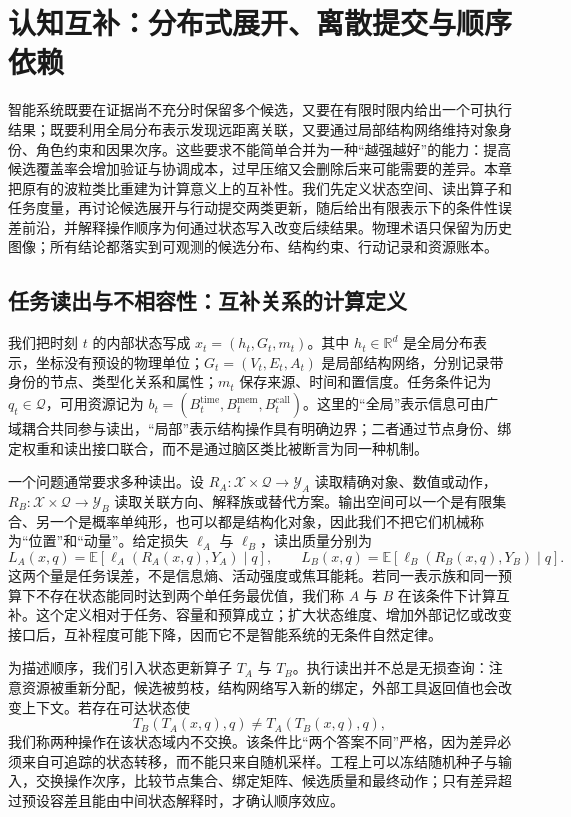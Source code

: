 \chapter{认知互补：分布式展开、离散提交与顺序依赖}
\label{chp:cognitive_complementarity}

智能系统既要在证据尚不充分时保留多个候选，又要在有限时限内给出一个可执行结果；既要利用全局分布表示发现远距离关联，又要通过局部结构网络维持对象身份、角色约束和因果次序。这些要求不能简单合并为一种“越强越好”的能力：提高候选覆盖率会增加验证与协调成本，过早压缩又会删除后来可能需要的差异。本章把原有的波粒类比重建为计算意义上的互补性。我们先定义状态空间、读出算子和任务度量，再讨论候选展开与行动提交两类更新，随后给出有限表示下的条件性误差前沿，并解释操作顺序为何通过状态写入改变后续结果。物理术语只保留为历史图像；所有结论都落实到可观测的候选分布、结构约束、行动记录和资源账本。

\section{任务读出与不相容性：互补关系的计算定义}
\label{sec:section_234544}

我们把时刻 $t$ 的内部状态写成 $x_t=(h_t,G_t,m_t)$。其中 $h_t\in\mathbb{R}^{d}$ 是全局分布表示，坐标没有预设的物理单位；$G_t=(V_t,E_t,A_t)$ 是局部结构网络，分别记录带身份的节点、类型化关系和属性；$m_t$ 保存来源、时间和置信度。任务条件记为 $q_t\in\mathcal Q$，可用资源记为 $b_t=(B_t^{\mathrm{time}},B_t^{\mathrm{mem}},B_t^{\mathrm{call}})$。这里的“全局”表示信息可由广域耦合共同参与读出，“局部”表示结构操作具有明确边界；二者通过节点身份、绑定权重和读出接口联合，而不是通过脑区类比被断言为同一种机制。

一个问题通常要求多种读出。设 $R_A:\mathcal X\times\mathcal Q\rightarrow\mathcal Y_A$ 读取精确对象、数值或动作，$R_B:\mathcal X\times\mathcal Q\rightarrow\mathcal Y_B$ 读取关联方向、解释族或替代方案。输出空间可以一个是有限集合、另一个是概率单纯形，也可以都是结构化对象，因此我们不把它们机械称为“位置”和“动量”。给定损失 $\ell_A$ 与 $\ell_B$，读出质量分别为
\[
L_A(x,q)=\mathbb E[\ell_A(R_A(x,q),Y_A)\mid q],\qquad
L_B(x,q)=\mathbb E[\ell_B(R_B(x,q),Y_B)\mid q].
\]
这两个量是任务误差，不是信息熵、活动强度或焦耳能耗。若同一表示族和同一预算下不存在状态能同时达到两个单任务最优值，我们称 $A$ 与 $B$ 在该条件下计算互补。这个定义相对于任务、容量和预算成立；扩大状态维度、增加外部记忆或改变接口后，互补程度可能下降，因而它不是智能系统的无条件自然定律。

为描述顺序，我们引入状态更新算子 $T_A$ 与 $T_B$。执行读出并不总是无损查询：注意资源被重新分配，候选被剪枝，结构网络写入新的绑定，外部工具返回值也会改变上下文。若存在可达状态使
\[
T_B(T_A(x,q),q)\neq T_A(T_B(x,q),q),
\]
我们称两种操作在该状态域内不交换。该条件比“两个答案不同”严格，因为差异必须来自可追踪的状态转移，而不能只来自随机采样。工程上可以冻结随机种子与输入，交换操作次序，比较节点集合、绑定矩阵、候选质量和最终动作；只有差异超过预设容差且能由中间状态解释时，才确认顺序效应。

